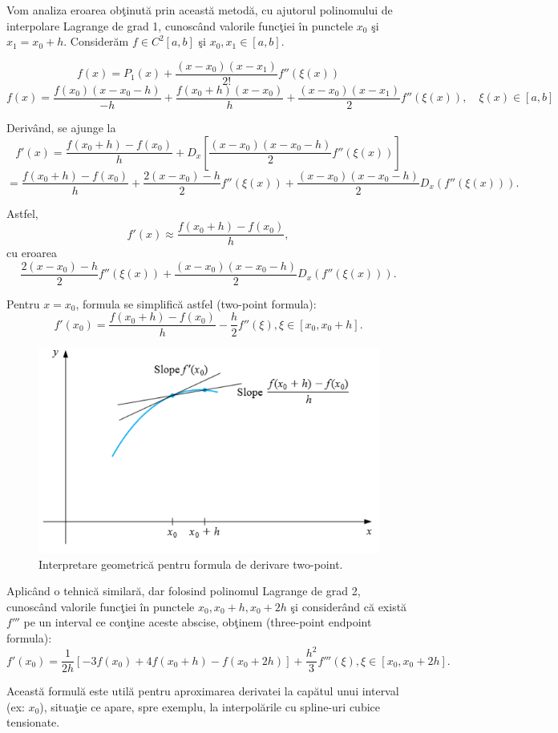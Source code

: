 \documentclass{exam}
\begin{document}
Vom analiza eroarea ob\c{t}inut\u{a} prin aceast\u{a} metod\u{a}, cu ajutorul polinomului de interpolare Lagrange de grad 1, cunosc\^{a}nd valorile func\c{t}iei \^{i}n punctele $x_0$ \c{s}i $x_1=x_0+h$. Consider\u{a}m $f\in C^2[a, b]$ şi $x_0, x_1 \in [a, b].$

$$f(x)=P_1(x)+\frac{(x-x_0)(x-x_1)}{2!}f''(\xi(x))$$
$$f(x)=\frac{f(x_0)(x-x_0-h)}{-h}+\frac{f(x_0+h)(x-x_0)}{h}+\frac{(x-x_0)(x-x_1)}{2}f''(\xi(x)), \quad
	\xi(x)\in[a, b]$$

Deriv\^{a}nd, se ajunge la
$$f'(x)=\frac{f(x_0+h)-f(x_0)}{h}+D_x\left[\frac{(x-x_0)(x-x_0-h)}{2}f''(\xi(x))\right]$$ $$=\frac{f(x_0+h)-f(x_0)}{h}+\frac{2(x-x_0)-h}{2}f''(\xi(x))+\frac{(x-x_0)(x-x_0-h)}{2}D_x(f''(\xi(x))).$$

Astfel, $$f'(x)\approx\frac{f(x_0+h)-f(x_0)}{h},$$
cu eroarea
$$\frac{2(x-x_0)-h}{2}f''(\xi(x))+\frac{(x-x_0)(x-x_0-h)}{2}D_x(f''(\xi(x))).$$

Pentru $x=x_0$, formula se simplific\u{a} astfel (two-point formula):
$$f'(x_0)=\frac{f(x_0+h)-f(x_0)}{h}-\frac{h}{2}f''(\xi), \xi \in [x_0, x_0+h].$$

\begin{figure}[ht]
	\begin{center}
		\includegraphics[width=0.5\columnwidth]{./img/d_simple}
		\caption{Interpretare geometrică pentru formula de derivare two-point.}
	\end{center}
\end{figure}

Aplic\^{a}nd o tehnic\u{a} similar\u{a}, dar folosind polinomul Lagrange de grad 2, cunosc\^{a}nd valorile func\c{t}iei \^{i}n punctele $x_0, x_0+h, x_0+2h$ \c{s}i consider\^{a}nd c\u{a} exist\u{a} $f'''$ pe un interval ce con\c{t}ine aceste abscise, ob\c{t}inem (three-point endpoint formula):
$$f'(x_0)=\frac{1}{2h}[-3f(x_0)+4f(x_0+h)-f(x_0+2h)]+\frac{h^2}{3}f'''(\xi), \xi \in [x_0, x_0+2h].$$

Aceast\u{a} formul\u{a} este util\u{a} pentru aproximarea derivatei la cap\u{a}tul unui interval (ex: $x_0$), situa\c{t}ie ce apare, spre exemplu, la interpol\u{a}rile cu spline-uri cubice tensionate.
\end{document}
